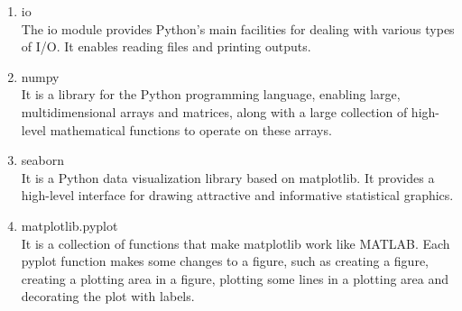\documentclass[11pt, conference]{IEEEtran}
\begin{document}
\begin{enumerate}[label=\arabic*]
\begin{enumerate}[label=\alph*]
\begin{enumerate}
            \item io\\
            The io module provides Python’s main facilities for dealing with various types of I/O. It enables reading files and printing outputs.
            \item numpy\\
            It is a library for the Python programming language, enabling large, multidimensional arrays and matrices, along with a large collection of high-level mathematical functions to operate on these arrays.
            \item seaborn\\
            It is a Python data visualization library based on matplotlib. It provides a high-level interface for drawing attractive and informative statistical graphics.
            \item matplotlib.pyplot\\
            It is a collection of functions that make matplotlib work like MATLAB. Each pyplot function makes some changes to a figure, such as creating a figure, creating a plotting area in a figure, plotting some lines in a plotting area and decorating the plot with labels.\\
        \end{enumerate}
    \end{enumerate}
    

\end{enumerate}
\end{document}
